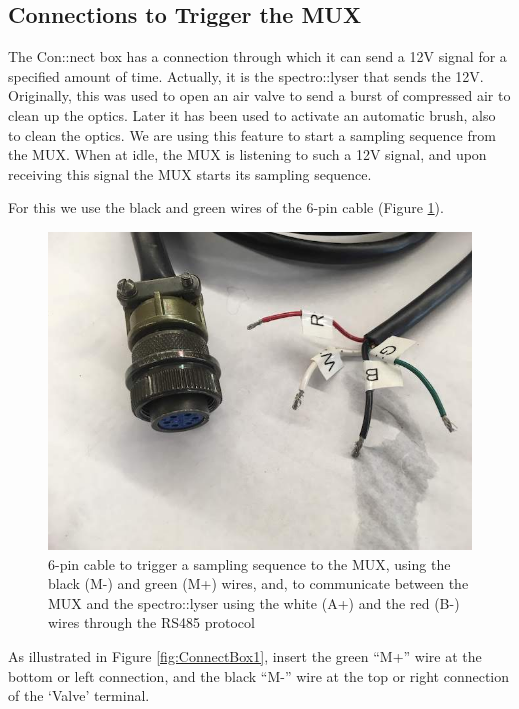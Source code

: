 \documentclass[]{book}
\begin{document}
\hypertarget{connections-to-trigger-the-mux}{%
\subsection{Connections to Trigger the MUX}\label{connections-to-trigger-the-mux}}

The Con::nect box has a connection through which it can send a 12V signal for a specified amount of time. Actually, it is the spectro::lyser that sends the 12V. Originally, this was used to open an air valve to send a burst of compressed air to clean up the optics. Later it has been used to activate an automatic brush, also to clean the optics. We are using this feature to start a sampling sequence from the MUX. When at idle, the MUX is listening to such a 12V signal, and upon receiving this signal the MUX starts its sampling sequence.

For this we use the black and green wires of the 6-pin cable (Figure \ref{fig:6-pin-cable}).

\begin{figure}

{\centering \includegraphics[width=0.8\linewidth]{pictures/6-pin-cable} 

}

\caption{6-pin cable to trigger a sampling sequence to the MUX, using the black (M-) and green (M+) wires, and, to communicate between the MUX and the spectro::lyser using the white (A+) and the red (B-) wires through the RS485 protocol}\label{fig:6-pin-cable}
\end{figure}

As illustrated in Figure \ref{fig:ConnectBox1}, insert the green ``M+'' wire at the bottom or left connection, and the black ``M-'' wire at the top or right connection of the `Valve' terminal.
\end{document}
